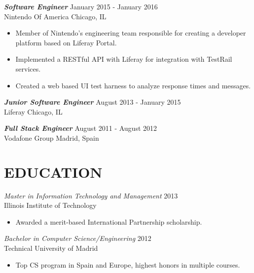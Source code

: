 \documentclass[overlapped, 10pt]{res} %
\begin{document}
\begin{resume}
{\sl \textbf{Software Engineer}} \hfill January 2015 - January 2016 \\
Nintendo Of America \hfill Chicago, IL
\begin{itemize} \itemsep -1pt %
\item Member of Nintendo’s engineering team responsible for creating a developer platform based on Liferay Portal.
\item Implemented a RESTful API with Liferay for integration with TestRail services.
\item Created a web based UI test harness to analyze response times and messages.
\end{itemize} 

{\sl \textbf{Junior Software Engineer}} \hfill August 2013 - January 2015 \\
Liferay \hfill Chicago, IL

{\sl \textbf{Full Stack Engineer}} \hfill August 2011 - August 2012 \\
Vodafone Group \hfill Madrid, Spain

 
\section{EDUCATION}\smallskip

{\sl Master in Information Technology and Management} \hfill 2013 \\
Illinois Institute of Technology
\begin{itemize}
\item Awarded a merit-based International Partnership scholarship.
\end{itemize} 

{\sl Bachelor in Computer Science/Engineering} \hfill 2012 \\
Technical University of Madrid
\begin{itemize} \itemsep -2pt %
\item Top CS program in Spain and Europe, highest honors in multiple courses.
\end{itemize}

\end{resume}
\end{document}
